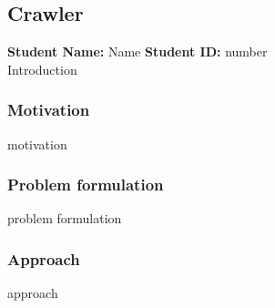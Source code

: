 \subsection{Crawler}
\textbf{Student Name: }Name \textbf{Student ID:} number\\
Introduction
\subsubsection*{Motivation}
motivation
\subsubsection*{Problem formulation}
problem formulation
\subsubsection*{Approach}
approach
